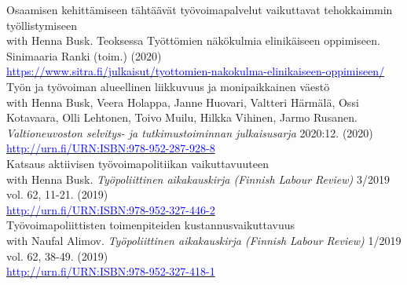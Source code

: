 \documentclass[16pt]{article}
\begin{document}
\noindent Osaamisen kehitt\"{a}miseen t\"{a}ht\"{a}\"{a}v\"{a}t ty\"{o}voimapalvelut vaikuttavat tehokkaimmin ty\"{o}llistymiseen \\
\noindent with Henna Busk. Teoksessa Työttömien näkökulmia elinikäiseen oppimiseen. Sinimaaria Ranki (toim.) (2020)  \\
\noindent  \href{https://www.sitra.fi/julkaisut/tyottomien-nakokulma-elinikaiseen-oppimiseen/}{\textcolor{blue}{https://www.sitra.fi/julkaisut/tyottomien-nakokulma-elinikaiseen-oppimiseen/}} \\

\noindent Ty\"{o}n ja ty\"{o}voiman alueellinen liikkuvuus ja monipaikkainen v\"{a}est\"{o} \\
\noindent with Henna Busk, Veera Holappa, Janne Huovari, Valtteri H\"{a}rm\"{a}l\"{a}, Ossi Kotavaara, Olli Lehtonen, Toivo Muilu, Hilkka Vihinen, Jarmo Rusanen. \textit{Valtioneuvoston selvitys- ja tutkimustoiminnan julkaisusarja} 2020:12. (2020)  \\
\noindent \href{http://urn.fi/URN:ISBN:978-952-287-928-8}{\textcolor{blue}{http://urn.fi/URN:ISBN:978-952-287-928-8}} \\

\noindent Katsaus aktiivisen ty\"{o}voimapolitiikan vaikuttavuuteen \\
\noindent with Henna Busk. \textit{Ty\"{o}poliittinen aikakauskirja (Finnish Labour Review)} 3/2019 vol. 62, 11-21.  (2019) \\
\noindent \href{http://urn.fi/URN:ISBN:978-952-327-446-2}{\textcolor{blue}{http://urn.fi/URN:ISBN:978-952-327-446-2}} \\

\noindent Ty\"{o}voimapoliittisten toimenpiteiden kustannusvaikuttavuus \\
\noindent with Naufal Alimov. \textit{Ty\"{o}poliittinen aikakauskirja (Finnish Labour Review)} 1/2019 vol. 62, 38-49.  (2019) \\
\noindent \href{http://urn.fi/URN:ISBN:978-952-287-645-4}{\textcolor{blue}{http://urn.fi/URN:ISBN:978-952-327-418-1}} \\
\end{document}

